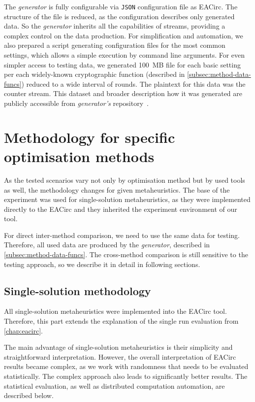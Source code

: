 \documentclass[
    digital,    %
    oneside,    %
    color,
    11pt,
    nocover,
    notable,
    nolof,
    nolot,
]{fithesis3}
\begin{document}
The \textit{generator} is fully configurable via \texttt{JSON} configuration file as EACirc. The structure of the file is reduced, as the configuration describes only generated data. So the \textit{generator} inherits all the capabilities of streams, providing a complex control on the data production. For simplification and automation, we also prepared a script generating configuration files for the most common settings, which allows a simple execution by command line arguments. For even simpler access to testing data, we generated 100~MB file for each basic setting per each widely-known cryptographic function (described in \cref{subsec:method-data-funcs}) reduced to a wide interval of rounds. The plaintext for this data was the counter stream. This dataset and broader description how it was generated are publicly accessible from \textit{generator's} repository~\cite{EACircStreams}.


\section{Methodology for specific optimisation methods}
\label{sec:method-spec}

As the tested scenarios vary not only by optimisation method but by used tools as well, the methodology changes for given metaheuristics. The base of the experiment was used for single-solution metaheuristics, as they were implemented directly to the EACirc and they inherited the experiment environment of our tool.

For direct inter-method comparison, we need to use the same data for testing. Therefore, all used data are produced by the \textit{generator}, described in \cref{subsec:method-data-funcs}. The cross-method comparison is still sensitive to the testing approach, so we describe it in detail in following sections.


\subsection{Single-solution methodology}
\label{subsec:method-spec-ss}

All single-solution metaheuristics were implemented into the EACirc tool. Therefore, this part extends the explanation of the single run evaluation from \cref{chap:eacirc}.

The main advantage of single-solution metaheuristics is their simplicity and straightforward interpretation. However, the overall interpretation of EACirc results became complex, as we work with randomness that needs to be evaluated statistically. The complex approach also leads to significantly better results. The statistical evaluation, as well as distributed computation automation, are described below.
\end{document}
